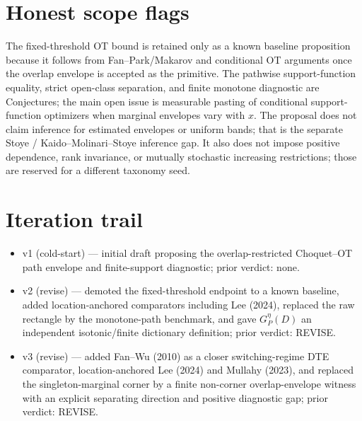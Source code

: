 \documentclass[11pt]{article}
\theoremstyle{definition}
\theoremstyle{plain}
\theoremstyle{remark}
\begin{document}
\section{Honest scope flags}
The fixed-threshold OT bound is retained only as a known baseline proposition because
it follows from Fan--Park/Makarov and conditional OT arguments once the overlap
envelope is accepted as the primitive.  The pathwise support-function equality, strict
open-class separation, and finite monotone diagnostic are Conjectures; the main open issue is measurable pasting of
conditional support-function optimizers when marginal envelopes vary with \(x\).  The
proposal does not claim inference for estimated envelopes or uniform bands; that is the
separate Stoye / Kaido--Molinari--Stoye inference gap.  It also does not impose positive
dependence, rank invariance, or mutually stochastic increasing restrictions; those are
reserved for a different taxonomy seed.

\section{Iteration trail}
\begin{itemize}[leftmargin=*]
\item v1 (cold-start) --- initial draft proposing the overlap-restricted Choquet--OT
path envelope and finite-support diagnostic; prior verdict: none.
\item v2 (revise) --- demoted the fixed-threshold endpoint to a known baseline,
added location-anchored comparators including Lee (2024), replaced the raw rectangle by
the monotone-path benchmark, and gave \(G^\eta_P(D)\) an independent isotonic/finite
dictionary definition; prior verdict: REVISE.
\item v3 (revise) --- added Fan--Wu (2010) as a closer switching-regime DTE comparator,
location-anchored Lee (2024) and Mullahy (2023), and replaced the singleton-marginal
corner by a finite non-corner overlap-envelope witness with an explicit separating
direction and positive diagnostic gap; prior verdict: REVISE.
\end{itemize}
\end{document}
